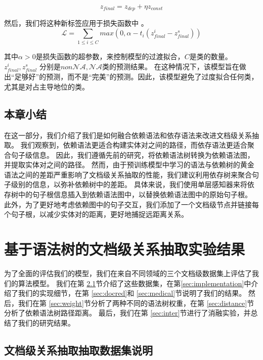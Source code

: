 \documentclass[bachelor]{thesis-uestc}
\begin{document}
\begin{equation}\label{eta}
    z_{final} = z_{dep} + \eta z_{const}
\end{equation}
\par 
然后，我们将这种新标签应用于损失函数中 \cite{SagDRE}。
\begin{equation}\label{loss}
    \mathcal{L} = \sum_{1 \le i \le C} max(0, \alpha-t_i(z^i_{final} - z^s_{final}))
\end{equation}

其中$\alpha>0$是损失函数的超参数，来控制模型的过渡拟合，$C$是类的数量。$z^i_{final}, z^s_{final}$ 分别是$non\mathcal{NA}, \mathcal{NA}$类的预测结果。
在这种情况下，该模型旨在做出“足够好”的预测，而不是“完美”的预测。因此，该模型避免了过度拟合任何类，尤其是对占主导地位的类。\par

\section{本章小结}
在这一部分，我们介绍了我们是如何融合依赖语法和依存语法来改进文档级关系抽取。
我们观察到，依赖语法更适合构建实体对之间的路径，而依存语法更适合聚合句子级信息。
因此，我们遵循先前的研究，将依赖语法树转换为依赖语法图，并提取实体对之间的路径。
然而，由于预训练模型中学习的语法与依赖树的黄金语法之间的差距严重影响了文档级关系抽取的性能，我们建议利用依存树来聚合句子级别的信息，以弥补依赖树中的差距。
具体来说，我们使用单层感知器来将依存树中的句子根信息插入到依赖语法图中，以替换依赖语法图中的原始句子根。
此外，为了更好地考虑依赖图中的句子交互，我们添加了一个文档级节点并链接每个句子根，以减少实体对的距离，更好地捕捉远距离关系。
\chapter{基于语法树的文档级关系抽取实验结果}
为了全面的评估我们的模型，我们在来自不同领域的三个文档级数据集上评估了我们的算法模型。
我们在第 \ref{sec:dataset}节介绍了这些数据集，在第\ref{sec:implementation}中介绍了我们的实现细节，在第 \ref{sec:docred}和 \ref{sec:medical}节说明了我们的结果。
然后，我们在第 \ref{sec:weight}节分析了两种不同的语法树权重，在第 \ref{sec:distance}节分析了依赖语法树路径距离。
最后，我们在第 \ref{sec:inter}节进行了消融实验，并总结了我们的研究结果。

\section{文档级关系抽取抽取数据集说明}\label{sec:dataset}
\end{document}
